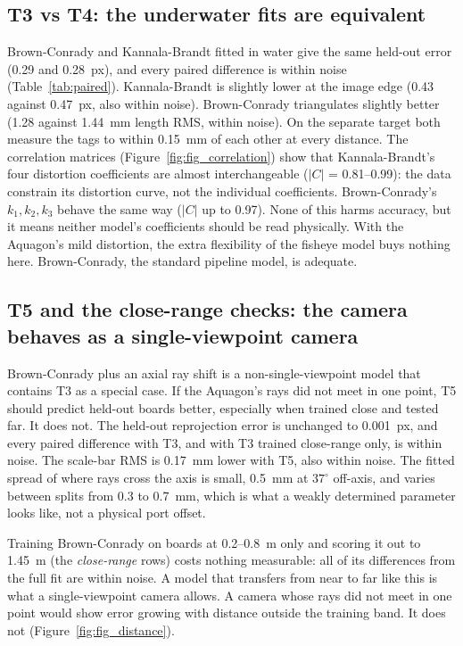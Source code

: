 \subsection{T3 vs T4: the underwater fits are equivalent}
Brown-Conrady and Kannala-Brandt fitted in water give the same held-out error (0.29 and 0.28~px), and
every paired difference is within noise (Table~\ref{tab:paired}). Kannala-Brandt is slightly lower at the
image edge (0.43 against 0.47~px, also within noise).
Brown-Conrady triangulates slightly better (1.28 against 1.44~mm length RMS, within noise). On the separate
target both measure the tags to within 0.15~mm of each other at every distance. The correlation matrices
(Figure~\ref{fig:fig_correlation}) show that Kannala-Brandt's four distortion coefficients are almost
interchangeable ($|C|$ = 0.81--0.99): the data constrain its distortion curve, not the individual
coefficients. Brown-Conrady's $k_1, k_2, k_3$ behave the same way ($|C|$ up to 0.97). None of this harms
accuracy, but it means neither model's coefficients should be read physically. With the Aquagon's mild
distortion, the extra flexibility of the fisheye model buys nothing here. Brown-Conrady, the standard
pipeline model, is adequate.

\subsection{T5 and the close-range checks: the camera behaves as a single-viewpoint camera}
Brown-Conrady plus an axial ray shift is a non-single-viewpoint model that contains T3 as a special case. If
the Aquagon's rays did not meet in one point, T5 should predict held-out boards better, especially when
trained close and tested far. It does not. The held-out reprojection error is unchanged to 0.001~px, and
every paired difference with T3, and with T3 trained close-range only, is within noise. The scale-bar RMS is
0.17~mm lower with T5, also within noise. The fitted spread of where rays cross the axis is small, 0.5~mm at
$37^\circ$ off-axis, and varies between splits from 0.3 to 0.7~mm, which is what a weakly determined
parameter looks like, not a physical port offset.

Training Brown-Conrady on boards at 0.2--0.8~m only and scoring it out to 1.45~m (the \emph{close-range}
rows) costs nothing measurable: all of its differences from the full fit are within noise. A model that
transfers from near to far like this is what a single-viewpoint camera allows. A camera whose rays did not
meet in one point would show error growing with distance outside the training band. It does not
(Figure~\ref{fig:fig_distance}).

